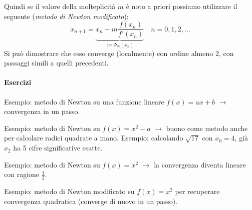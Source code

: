 \documentclass[a4paper]{report}
\theoremstyle{definiton}
\theoremstyle{remark}
\begin{document}
Quindi se il valore della molteplicità $m$ è noto a priori possiamo utilizzare il seguente (\emph{metodo di Newton modificato}):
\begin{equation} \label{newtonmod}
    x_{n+1} = \underbrace{x_n - m\frac{f(x_n)}{f'(x_n)}}_{:=\Phi_m(x_n)} \quad n = 0,1,2,\dots    
\end{equation}
Si può dimostrare che esso converge (localmente) con ordine almeno 2, con passaggi simili a quelli precedenti.

\paragraph{Esercizi}

Esempio: metodo di Newton su una funzione lineare $f(x) = a x + b$ $\rightarrow$ convergenza in un passo.

Esempio: metodo di Newton su $f(x) = x^2-a$ $\rightarrow$ buono come metodo anche per calcolare radici quadrate a mano. Esempio: calcolando $\sqrt{17}$ con $x_0 = 4$, già $x_2$ ha 5 cifre significative esatte.

Esempio: metodo di Newton su $f(x) = x^2$ $\rightarrow$ la convergenza diventa lineare con ragione $\frac12$.

Esempio: metodo di Newton modificato su $f(x) = x^2$ per recuperare convergenza quadratica (converge di nuovo in un passo).
\end{document}
